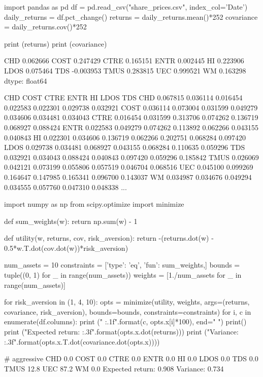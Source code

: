 \cprotEnv \begin{solution}
\begin{ipython}
import pandas as pd
df = pd.read_csv("share_prices.csv", index_col='Date')
daily_returns = df.pct_change()
returns = daily_returns.mean()*252
covariance = daily_returns.cov()*252

print (returns)
print (covariance)
\end{ipython}
\begin{ioutput}
CHD     0.062666
COST    0.247429
CTRE    0.165151
ENTR    0.002445
HI      0.223906
LDOS    0.075464
TDS    -0.003953
TMUS    0.283815
UEC     0.999521
WM      0.163298
dtype: float64

           CHD     COST       CTRE      ENTR        HI      LDOS       TDS
CHD   0.067815  0.036114  0.016454  0.022583  0.022301  0.029738  0.032921   
COST  0.036114  0.073004  0.031599  0.049279  0.034606  0.034481  0.034043   
CTRE  0.016454  0.031599  0.313706  0.074262  0.136719  0.068927  0.088424   
ENTR  0.022583  0.049279  0.074262  0.113892  0.062266  0.043155  0.040843   
HI    0.022301  0.034606  0.136719  0.062266  0.202751  0.068284  0.097420   
LDOS  0.029738  0.034481  0.068927  0.043155  0.068284  0.110635  0.059296   
TDS   0.032921  0.034043  0.088424  0.040843  0.097420  0.059296  0.185842   
TMUS  0.026069  0.042121  0.073199  0.055806  0.057519  0.046704  0.068516   
UEC   0.045100  0.099269  0.164647  0.147985  0.165341  0.096700  0.143037   
WM    0.034987  0.034676  0.049294  0.034555  0.057760  0.047310  0.048338   
...
\end{ioutput}
\begin{ipython}
import numpy as np
from scipy.optimize import minimize

def sum_weights(w): 
    return np.sum(w) - 1

def utility(w, returns, cov, risk_aversion):
    return -(returns.dot(w) - 0.5*w.T.dot(cov.dot(w))*risk_aversion)

num_assets = 10
constraints = [{'type': 'eq', 'fun': sum_weights},] 
bounds = tuple((0, 1) for _ in range(num_assets))
weights = [1./num_assets for _ in range(num_assets)]

for risk_aversion in (1, 4, 10):
  opts = minimize(utility, weights, args=(returns, covariance, risk_aversion),
                bounds=bounds, constraints=constraints)
  for i, c in enumerate(df.columns):
    print ("{} {:.1f}".format(c, opts.x[i]*100), end=" ")
  print()
  print ("Expected return: {:.3f}".format(opts.x.dot(returns)))
  print ("Variance: {:.3f}".format(opts.x.T.dot(covariance.dot(opts.x))))
\end{ipython}
\begin{ioutput}
# aggressive
CHD 0.0 COST 0.0 CTRE 0.0 ENTR 0.0 HI 0.0 LDOS 0.0 TDS 0.0 TMUS 12.8 UEC 87.2 WM 0.0 
Expected return: 0.908
Variance: 0.734


\end{ioutput}
\end{solution}

